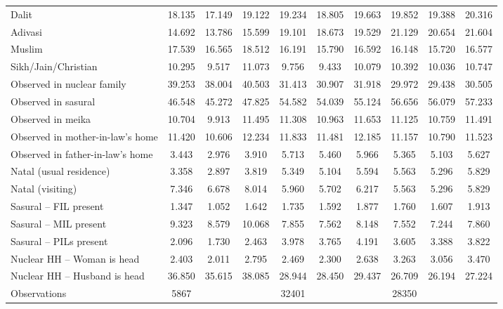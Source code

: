 {\begin{tabular}{l*{3}{ccc}}
Dalit               &      18.135&      17.149&      19.122&      19.234&      18.805&      19.663&      19.852&      19.388&      20.316\\
Adivasi             &      14.692&      13.786&      15.599&      19.101&      18.673&      19.529&      21.129&      20.654&      21.604\\
Muslim              &      17.539&      16.565&      18.512&      16.191&      15.790&      16.592&      16.148&      15.720&      16.577\\
Sikh/Jain/Christian &      10.295&       9.517&      11.073&       9.756&       9.433&      10.079&      10.392&      10.036&      10.747\\
Observed in nuclear family&      39.253&      38.004&      40.503&      31.413&      30.907&      31.918&      29.972&      29.438&      30.505\\
Observed in sasural &      46.548&      45.272&      47.825&      54.582&      54.039&      55.124&      56.656&      56.079&      57.233\\
Observed in meika   &      10.704&       9.913&      11.495&      11.308&      10.963&      11.653&      11.125&      10.759&      11.491\\
Observed in mother-in-law's home&      11.420&      10.606&      12.234&      11.833&      11.481&      12.185&      11.157&      10.790&      11.523\\
Observed in father-in-law's home&       3.443&       2.976&       3.910&       5.713&       5.460&       5.966&       5.365&       5.103&       5.627\\
Natal (usual residence)&       3.358&       2.897&       3.819&       5.349&       5.104&       5.594&       5.563&       5.296&       5.829\\
Natal (visiting)    &       7.346&       6.678&       8.014&       5.960&       5.702&       6.217&       5.563&       5.296&       5.829\\
Sasural – FIL present&       1.347&       1.052&       1.642&       1.735&       1.592&       1.877&       1.760&       1.607&       1.913\\
Sasural – MIL present&       9.323&       8.579&      10.068&       7.855&       7.562&       8.148&       7.552&       7.244&       7.860\\
Sasural – PILs present&       2.096&       1.730&       2.463&       3.978&       3.765&       4.191&       3.605&       3.388&       3.822\\
Nuclear HH – Woman is head&       2.403&       2.011&       2.795&       2.469&       2.300&       2.638&       3.263&       3.056&       3.470\\
Nuclear HH – Husband is head&      36.850&      35.615&      38.085&      28.944&      28.450&      29.437&      26.709&      26.194&      27.224\\
\hline
Observations        &        5867&            &            &       32401&            &            &       28350&            &            \\
\hline\hline
\end{tabular}
}
